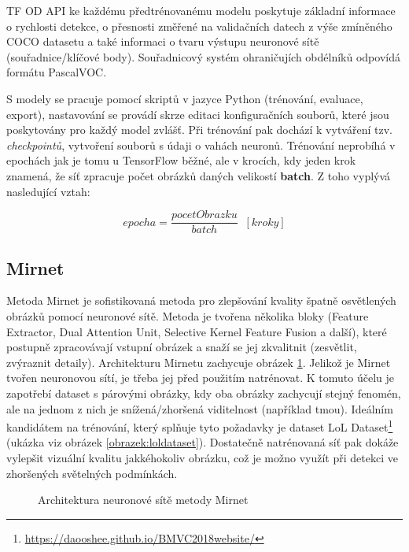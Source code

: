 TF OD API ke každému předtrénovanému modelu poskytuje základní informace o rychlosti detekce, o přesnosti změřené na validačních datech z výše zmíněného COCO datasetu a také informaci o tvaru výstupu neuronové sítě (souřadnice/klíčové body). Souřadnicový systém ohraničujích obdélníků odpovídá formátu PascalVOC. 

S modely se pracuje pomocí skriptů v jazyce Python (trénování, evaluace, export), nastavování se provádí skrze editaci konfiguračních souborů, které jsou poskytovány pro každý model zvlášť. Při trénování pak dochází k vytváření tzv. \emph{checkpointů}, vytvoření souborů s údaji o vahách neuronů. Trénování neprobíhá v epochách jak je tomu u TensorFlow běžné, ale v krocích, kdy jeden krok znamená, že síť zpracuje počet obrázků daných velikostí \textbf{batch}. Z toho vyplývá nasledující vztah:

\begin{equation}
  epocha = \frac{pocetObrazku}{batch}  \;\;[kroky]  
\end{equation}


\subsection*{Mirnet}
Metoda Mirnet\cite{mirnet} je sofistikovaná metoda pro zlepšování kvality špatně osvětlených obrázků pomocí neuronové sítě. Metoda je tvořena několika bloky (Feature Extractor, Dual Attention Unit, Selective Kernel Feature Fusion a další), které postupně zpracovávají vstupní obrázek a snaží se jej zkvalitnit (zesvětlit, zvýraznit detaily). Architekturu Mirnetu zachycuje obrázek \ref{obrazek:mirnet}. Jelikož je Mirnet tvořen neuronovou sítí, je třeba jej před použitím natrénovat. K tomuto účelu je zapotřebí dataset s párovými obrázky, kdy oba obrázky zachycují stejný fenomén, ale na jednom z nich je snížená/zhoršená viditelnost (například tmou). Ideálním kandidátem na trénování, který splňuje tyto požadavky je dataset LoL Dataset\footnote{\url{https://daooshee.github.io/BMVC2018website/}} (ukázka viz obrázek \ref{obrazek:loldataset}). Dostatečně natrénovaná síť pak dokáže vylepšit vizuální kvalitu jakkéhokoliv obrázku, což je možno využít při detekci ve zhoršených světelných podmínkách.

\begin{figure}[H]
  \begin{center}
  \label{obrazek:mirnet}
  \caption{Architektura neuronové sítě metody Mirnet}
  \end{center}
\end{figure}


